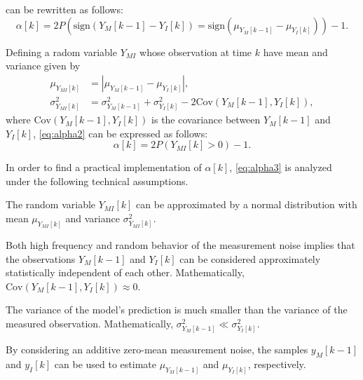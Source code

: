  can be rewritten as follows:
%
\begin{equation}
    \alpha[k] = 
    2 P(\mathrm{sign}(Y_M[k-1] - Y_I[k]) = \mathrm{sign}(\mu_{Y_M[k-1]} - \mu_{Y_I[k]})) 
    - 1.
\label{eq:alpha2}
\end{equation}

Defining a radom variable $Y_{MI}$ whose observation at time $k$ have mean and variance given by
%
\begin{align}
    \mu_{Y_{MI}[k]} &= |\mu_{Y_M[k-1]} - \mu_{Y_I[k]}|, \\
    \sigma^2_{Y_{MI}[k]} &= \sigma^2_{Y_M[k-1]} + \sigma^2_{Y_I[k]} - 2 \mathrm{Cov}(Y_M[k-1], Y_I[k]),
\end{align}
%
where $\mathrm{Cov}(Y_M[k-1], Y_I[k])$ is the covariance between $Y_M[k-1]$ and $Y_I[k]$, 
\cref{eq:alpha2} can be expressed as follows:
%
\begin{equation}
    \alpha[k] = 2 P(Y_{MI}[k] > 0) - 1.
\label{eq:alpha3}
\end{equation}

In order to find a practical implementation of $\alpha[k]$, \cref{eq:alpha3} is analyzed under the following
technical assumptions.

\begin{assumption}
    The random variable $Y_{MI}[k]$ can be approximated by a normal distribution 
    with mean $\mu_{Y_{MI}[k]}$ and variance $\sigma^2_{Y_{MI}[k]}$.
\label{assumption:normal}
\end{assumption}

\begin{assumption}
    Both high frequency and random behavior of the measurement noise implies that 
    the observations $Y_M[k - 1]$ and $Y_I[k]$ can be considered approximately statistically independent of each other. 
    Mathematically, $\mathrm{Cov} (Y_M[k-1], Y_I[k]) \approx 0$.
\label{assumption:independence}
\end{assumption}

\begin{assumption}
    The variance of the model's prediction is much smaller than the variance of the measured observation.
    Mathematically, $\sigma^2_{Y_M[k-1]} \ll \sigma^2_{Y_I[k]}$.
\label{assumption:variances}
\end{assumption}

\begin{assumption}
    By considering an additive zero-mean measurement noise, the samples $y_M[k-1]$ and $y_I[k]$ 
    can be used to estimate $\mu_{Y_M[k-1]}$ and $\mu_{Y_I[k]}$, respectively.
\label{assumption:means}
\end{assumption}

